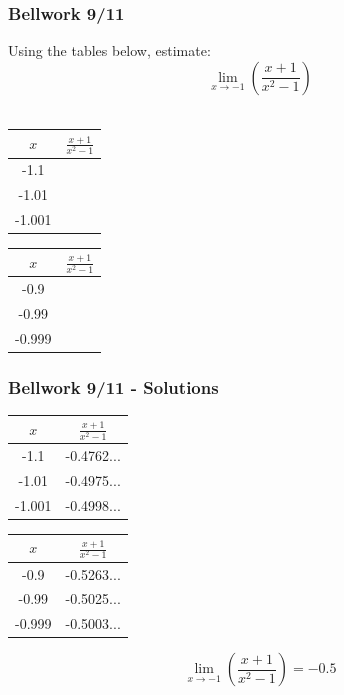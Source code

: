 \documentclass[12pt]{beamer}
\begin{document}
\begin{frame}
	\frametitle{Bellwork 9/11}
	\vspace*{\fill}
	\vspace*{\fill}
	\initclock
	Using the tables below, estimate: \[\displaystyle\lim_{x\to-1}\left(\frac{x+1}{x^2-1}\right)\]\\
	\large
	\begin{table}[]
		\begin{tabular}{c|c}
			$x$    & $\frac{x+1}{x^2-1}$ \\ \hline
			-1.1   &                     \\
			-1.01  &                     \\
			-1.001 &
		\end{tabular}
		\hspace{0.75cm}
		\begin{tabular}{c|c}
			$x$    & $\frac{x+1}{x^2-1}$ \\ \hline
			-0.9   &                     \\
			-0.99  &                     \\
			-0.999 &
		\end{tabular}
	\end{table}
	\vspace*{\fill}
	\crono
\end{frame}
\begin{frame}
	\frametitle{Bellwork 9/11 - Solutions}
	\vspace*{\fill}
	\vspace*{\fill}
	\begin{table}[]
		\begin{tabular}{c|c}
			$x$    & $\frac{x+1}{x^2-1}$ \\ \hline
			-1.1   & -0.4762...          \\
			-1.01  & -0.4975...          \\
			-1.001 & -0.4998...
		\end{tabular}
		\hspace{0.75cm}
		\begin{tabular}{c|c}
			$x$    & $\frac{x+1}{x^2-1}$ \\ \hline
			-0.9   & -0.5263...          \\
			-0.99  & -0.5025...          \\
			-0.999 & -0.5003...
		\end{tabular}
	\end{table}
	\vspace*{\fill}
	\[\displaystyle\lim_{x\to-1}\left(\frac{x+1}{x^2-1}\right) = -0.5\]
\end{frame}
\end{document}
